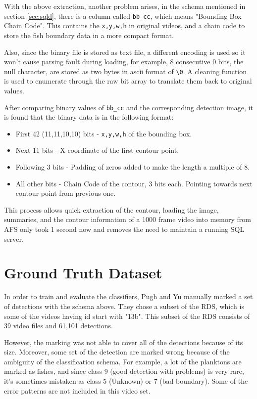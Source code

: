 \documentclass[bsc,logo,twoside,fullspacing,parskip]{infthesis}
\begin{document}
With the above extraction, another problem arises, in the schema mentioned in section \ref{sec:sqld}, there is a column called {\tt bb\_cc}, which means "Bounding Box Chain Code". This contains the {\tt x,y,w,h} in original videos, and a chain code to store the fish boundary data in a more compact format.

Also, since the binary file is stored as text file, a different encoding is used so it won't cause parsing fault during loading, for example, 8 consecutive 0 bits, the null character, are stored as two bytes in ascii format of {\tt \textbackslash0}. A cleaning function is used to enumerate through the raw bit array to translate them back to original values.

After comparing binary values of {\tt bb\_cc} and the corresponding detection image, it is found that the binary data is in the following format:
\begin{itemize}
\item
First 42 (11,11,10,10) bits - {\tt x,y,w,h} of the bounding box.
\item
Next 11 bits - X-coordinate of the first contour point.
\item
Following 3 bits - Padding of zeros added to make the length a multiple of 8.
\item
All other bits - Chain Code of the contour, 3 bits each. Pointing towards next contour point from previous one. 
\end{itemize}

This process allows quick extraction of the contour, loading the image, summaries, and the contour information of a 1000 frame video into memory from AFS only took 1 second now and removes the need to maintain a running SQL server.

\section{Ground Truth Dataset}

In order to train and evaluate the classifiers, Pugh and Yu manually marked a set of detections with the schema above. They chose a subset of the RDS, which is some of the videos having id start with "13b". This subset of the RDS consists of 39 video files and 61,101 detections. 

However, the marking was not able to cover all of the detections because of its size. Moreover, some set of the detection are marked wrong because of the ambiguity of the classification schema. For example, a lot of the planktons are marked as fishes, and since class 9 (good detection with problems) is very rare, it's sometimes mistaken as class 5 (Unknown) or 7 (bad boundary). Some of the error patterns are not included in this video set.
\end{document}
